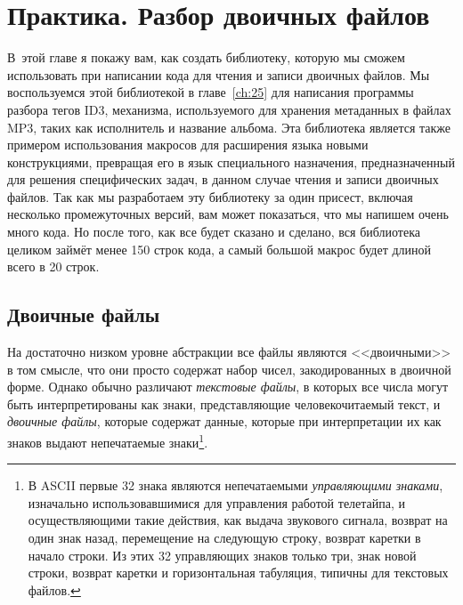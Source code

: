\chapter{Практика. Разбор двоичных файлов}
\label{ch:24}

\thispagestyle{empty}

В~этой главе я покажу вам, как создать библиотеку, которую мы сможем использовать при
написании кода для чтения и записи двоичных файлов. Мы воспользуемся этой библиотекой в
главе~\ref{ch:25} для написания программы разбора тегов ID3, механизма, используемого для
хранения метаданных в файлах MP3, таких как исполнитель и название альбома. Эта библиотека
является также примером использования макросов для расширения языка новыми конструкциями,
превращая его в язык специального назначения, предназначенный для решения специфических
задач, в данном случае чтения и записи двоичных файлов. Так как мы разработаем эту
библиотеку за один присест, включая несколько промежуточных версий, вам может показаться,
что мы напишем очень много кода. Но после того, как все будет сказано и сделано, вся
библиотека целиком займёт менее 150 строк кода, а самый большой макрос будет длиной всего
в 20 строк.

\section{Двоичные файлы}

На достаточно низком уровне абстракции все файлы являются <<двоичными>> в том смысле, что
они просто содержат набор чисел, закодированных в двоичной форме.  Однако обычно
различают \textit{текстовые файлы}, в которых все числа могут быть интерпретированы как
знаки, представляющие человекочитаемый текст, и \textit{двоичные файлы}, которые содержат
данные, которые при интерпретации их как знаков выдают непечатаемые знаки\footnote{В
  ASCII первые 32 знака являются непечатаемыми \textit{управляющими знаками}, изначально
  использовавшимися для управления работой телетайпа, и осуществляющими такие действия, как
  выдача звукового сигнала, возврат на один знак назад, перемещение на следующую строку,
  возврат каретки в начало строки. Из этих 32 управляющих знаков только три, знак новой
  строки, возврат каретки и горизонтальная табуляция, типичны для текстовых файлов.}.

